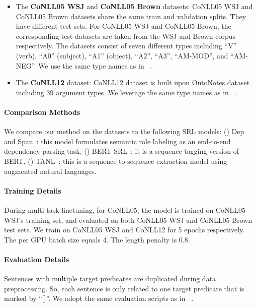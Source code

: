 \begin{itemize}
    \item The {\bf CoNLL05 WSJ} and {\bf CoNLL05 Brown} datasets: CoNLL05 WSJ and CoNLL05 Brown datasets share the same train and validation splits. They have different test sets. For CoNLL05 WSJ and CoNLL05 Brown, the corresponding test datasets are taken from the WSJ and Brown corpus respectively. The datasets consist of seven different types including ``V'' (verb), ``A0'' (subject), ``A1'' (object), ``A2'', ``A3'', ``AM-MOD'', and ``AM-NEG''. We use the same type names as in ~\cite{paolini2021structured}. 
    \item The {\bf CoNLL12} dataset: CoNLL12 dataset is built upon OntoNotes dataset including 39 argument types. We leverage the same type names as in ~\cite{paolini2021structured}.
\end{itemize}

\paragraph{Comparison Methods}
We compare our method \method on the datasets to the following SRL models: (\expandafter{}) Dep and Span~\cite{li2019dependency}: this model formulates semantic role labeling as an end-to-end dependency parsing task, (\expandafter{}) BERT SRL~\cite{shi2019simple}: it is a sequence-tagging version of BERT, (\expandafter{}) TANL~\cite{paolini2021structured}: this is a sequence-to-sequence extraction model using augmented natural languages. 

\paragraph{Training Details}
During multi-task finetuning, for CoNLL05, the model is trained on CoNLL05 WSJ's training set, and evaluated on both CoNLL05 WSJ and CoNLL05 Brown test sets. We train \method on CoNLL05 WSJ and CoNLL12 for 5 epochs respectively. The per GPU batch size equals 4. The length penalty is 0.8. 

\paragraph{Evaluation Details} Sentences with multiple target predicates are duplicated during data preprocessing. So, each sentence is only related to one target predicate that is marked by ``[]''. We adopt the same evaluation scripts as in ~\cite{paolini2021structured}.

